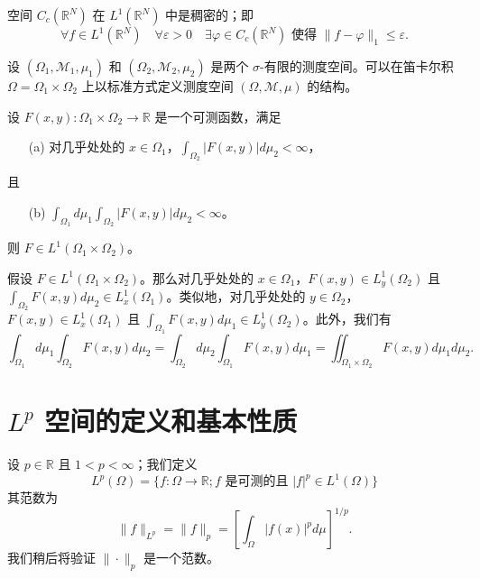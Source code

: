 \begin{theorem}[稠密性]\label{theorem4.3}
空间 $C_c(\mathbb{R}^N)$ 在 $L^1(\mathbb{R}^N)$ 中是稠密的；即
\[ \forall f \in L^1(\mathbb{R}^N) \quad \forall \varepsilon > 0 \quad \exists \varphi \in C_c(\mathbb{R}^N) \text{ 使得 } \|f - \varphi\|_1 \le \varepsilon. \]
\end{theorem}

设 $(\Omega_1, \mathcal{M}_1, \mu_1)$ 和 $(\Omega_2, \mathcal{M}_2, \mu_2)$ 是两个 $\sigma$-有限的测度空间。可以在笛卡尔积 $\Omega = \Omega_1 \times \Omega_2$ 上以标准方式定义测度空间 $(\Omega, \mathcal{M}, \mu)$ 的结构。

\begin{theorem}[Tonelli]\label{theorem4.4}
设 $F(x, y): \Omega_1 \times \Omega_2 \to \mathbb{R}$ 是一个可测函数，满足
\begin{itemize}
    \item[(a)] 对几乎处处的 $x \in \Omega_1$，$\int_{\Omega_2} |F(x, y)| d\mu_2 < \infty$，
\end{itemize}
且
\begin{itemize}
    \item[(b)] $\int_{\Omega_1} d\mu_1 \int_{\Omega_2} |F(x,y)| d\mu_2 < \infty$。
\end{itemize}
则 $F \in L^1(\Omega_1 \times \Omega_2)$。
\end{theorem}

\begin{theorem}[Fubini]\label{theorem4.5}
假设 $F \in L^1(\Omega_1 \times \Omega_2)$。那么对几乎处处的 $x \in \Omega_1$，$F(x, y) \in L^1_y(\Omega_2)$ 且 $\int_{\Omega_2} F(x, y) d\mu_2 \in L^1_x(\Omega_1)$。类似地，对几乎处处的 $y \in \Omega_2$，$F(x, y) \in L^1_x(\Omega_1)$ 且 $\int_{\Omega_1} F(x, y) d\mu_1 \in L^1_y(\Omega_2)$。此外，我们有
\[ \int_{\Omega_1} d\mu_1 \int_{\Omega_2} F(x,y) d\mu_2 = \int_{\Omega_2} d\mu_2 \int_{\Omega_1} F(x, y) d\mu_1 = \iint_{\Omega_1 \times \Omega_2} F(x,y) d\mu_1 d\mu_2. \]
\end{theorem}

\section{$L^p$ 空间的定义和基本性质}

\begin{definition}
设 $p \in \mathbb{R}$ 且 $1 < p < \infty$；我们定义
\[ L^p(\Omega) = \{f: \Omega \to \mathbb{R}; f \text{ 是可测的且 } |f|^p \in L^1(\Omega)\} \]
其范数为
\[ \|f\|_{L^p} = \|f\|_p = \left[ \int_\Omega |f(x)|^p d\mu \right]^{1/p}. \]
我们稍后将验证 $\| \cdot \|_p$ 是一个范数。
\end{definition}


